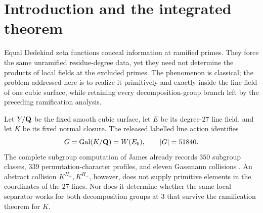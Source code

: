 \section{Introduction and the integrated theorem}
\label{sec:introduction}

Equal Dedekind zeta functions conceal information at ramified primes.  They
force the same unramified residue-degree data, yet they need not determine
the products of local fields at the excluded primes.  The phenomenon is
classical; the problem addressed here is to realize it primitively and
exactly inside the line field of one cubic surface, while retaining every
decomposition-group branch left by the preceding ramification analysis.

Let $Y/\mathbf{Q}$ be the fixed smooth cubic surface, let $E$ be its degree-$27$
line field, and let $K$ be its fixed normal closure.  The released labelled
line action identifies
\begin{equation}
  G=\operatorname{Gal}(K/\mathbf{Q})=W(E_6),
  \qquad |G|=51840.
  \label{eq:intro-G}
\end{equation}
The complete subgroup computation of James already records $350$ subgroup
classes, $339$ permutation-character profiles, and eleven Gassmann
collisions \citep[\S3.1, p.~22]{james2022bayesian}.  An abstract collision
$K^{H_+},K^{H_-}$, however, does not supply primitive elements in the
coordinates of the $27$ lines.  Nor does it determine whether the same
local separator works for both decomposition groups at $3$ that survive the
ramification theorem for $K$.

